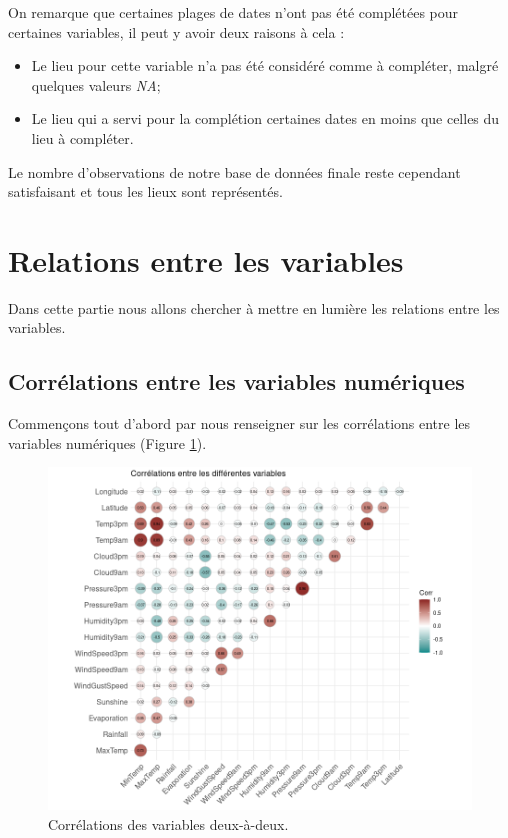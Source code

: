 \documentclass{article}
\begin{document}
On remarque que certaines plages de dates n'ont pas été complétées pour certaines variables, il peut y avoir deux raisons à cela : 
\begin{itemize}
    \item Le lieu pour cette variable n'a pas été considéré comme à compléter, malgré quelques valeurs \emph{NA};
    \item Le lieu qui a servi pour la complétion certaines dates en moins que celles du lieu à compléter.
\end{itemize}
Le nombre d'observations de notre base de données finale reste cependant satisfaisant et tous les lieux sont représentés.

\section{Relations entre les variables}

Dans cette partie nous allons chercher à mettre en lumière les relations entre les variables.

\subsection{Corrélations entre les variables numériques}

Commençons tout d'abord par nous renseigner sur les corrélations entre les variables numériques (Figure \ref{fig:correlations}). 

\begin{figure}[htp]
    \centering
    \includegraphics[width=\textwidth]{Images/correlations_variables.png}
    \caption{Corrélations des variables deux-à-deux.}
    \label{fig:correlations}
\end{figure}
\end{document}

